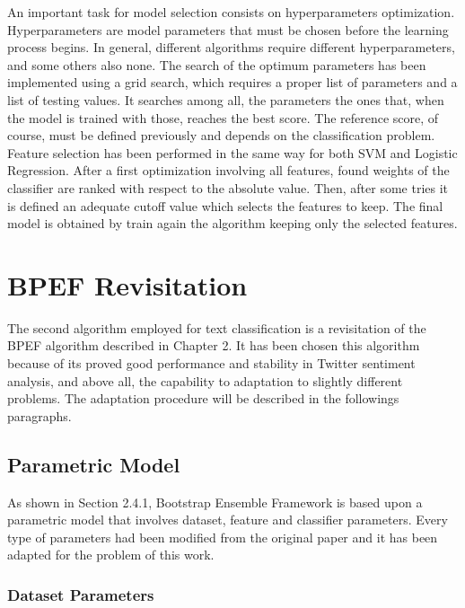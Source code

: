 An important task for model selection consists on hyperparameters optimization. Hyperparameters are model parameters that must be chosen before the learning process begins. In general, different algorithms require different hyperparameters, and some others also none. The search of the optimum parameters has been implemented using a grid search, which requires a proper list of parameters and a list of testing values. It searches among all, the parameters the ones that, when the model is trained with those, reaches the best score. The reference score, of course, must be defined previously and depends on the classification problem.
Feature selection has been performed in the same way for both SVM and Logistic Regression. After a first optimization involving all features, found weights of the classifier are ranked with respect to the absolute value. Then, after some tries it is defined an adequate cutoff value which selects the features to keep. The final model is obtained by train again the algorithm keeping only the selected features.


\section{BPEF Revisitation}

The second algorithm employed for text classification is a revisitation of the BPEF algorithm described in Chapter 2. It has been chosen this algorithm because of its proved good performance and stability in Twitter sentiment analysis, and above all, the capability to adaptation to slightly different problems. The adaptation procedure will be described in the followings paragraphs.

\subsection{Parametric Model}

As shown in Section 2.4.1, Bootstrap Ensemble Framework is based upon a parametric model that involves dataset, feature and classifier parameters. Every type of parameters had been modified from the original paper and it has been adapted for the problem of this work.

\subsubsection{Dataset Parameters}

